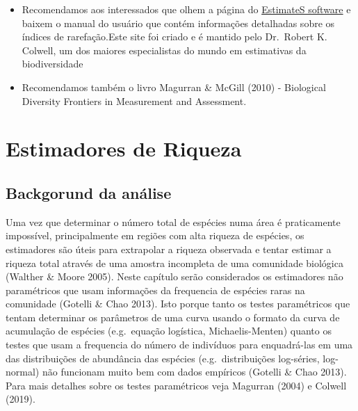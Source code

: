 \documentclass[
]{book}
\begin{document}
\begin{itemize}
\item
  Recomendamos aos interessados que olhem a página do \href{http://viceroy.eeb.uconn.edu/estimates}{EstimateS software} e baixem o manual do usuário que contém informações detalhadas sobre os índices de rarefação.Este site foi criado e é mantido pelo Dr.~Robert K. Colwell, um dos maiores especialistas do mundo em estimativas da biodiversidade
\item
  Recomendamos também o livro Magurran \& McGill (2010) - Biological Diversity Frontiers in Measurement and Assessment.
\end{itemize}

\hypertarget{estimadores-de-riqueza}{%
\chapter{Estimadores de Riqueza}\label{estimadores-de-riqueza}}

\hypertarget{backgorund-da-anuxe1lise-1}{%
\section{Backgorund da análise}\label{backgorund-da-anuxe1lise-1}}

Uma vez que determinar o número total de espécies numa área é praticamente impossível, principalmente em regiões com alta riqueza de espécies, os estimadores são úteis para extrapolar a riqueza observada e tentar estimar a riqueza total através de uma amostra incompleta de uma comunidade biológica (Walther \& Moore 2005). Neste capítulo serão considerados os estimadores não paramétricos que usam informações da frequencia de espécies raras na comunidade (Gotelli \& Chao 2013). Isto porque tanto os testes paramétricos que tentam determinar os parâmetros de uma curva usando o formato da curva de acumulação de espécies (e.g.~equação logística, Michaelis-Menten) quanto os testes que usam a frequencia do número de indivíduos para enquadrá-las em uma das distribuições de abundância das espécies (e.g.~distribuições log-séries, log-normal) não funcionam muito bem com dados empíricos (Gotelli \& Chao 2013). Para mais detalhes sobre os testes paramétricos veja Magurran (2004) e Colwell (2019).
\end{document}
